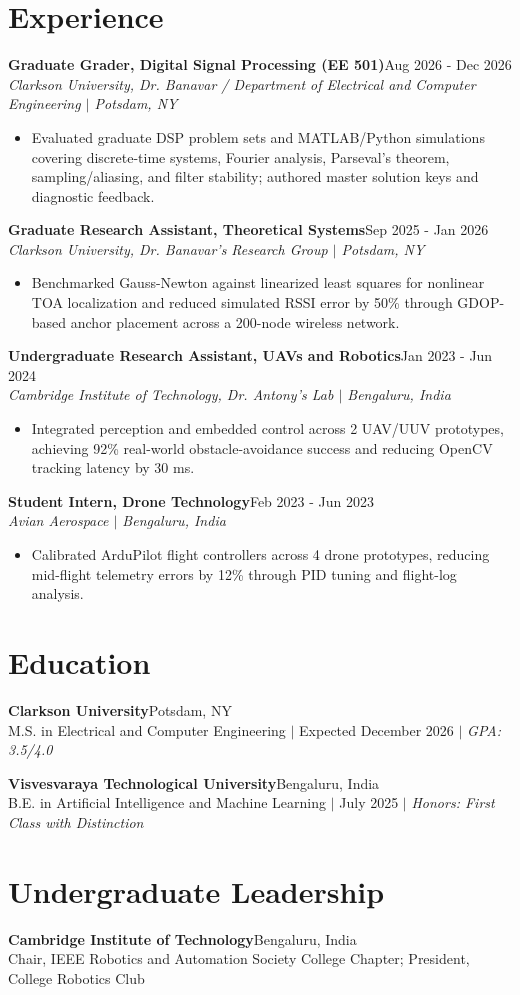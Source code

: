 \documentclass[10pt,letterpaper]{article}
\newcommand{\entry}[2]{\textbf{#1}\hfill #2\\[-1pt]}
\begin{document}
\section{Experience}
\entry{Graduate Grader, Digital Signal Processing (EE 501)}{Aug 2026 - Dec 2026}
{\small\textit{Clarkson University, Dr. Banavar / Department of Electrical and Computer Engineering $\mid$ Potsdam, NY}}
\begin{itemize}
  \item {\small Evaluated graduate DSP problem sets and MATLAB/Python simulations covering discrete-time systems, Fourier analysis, Parseval's theorem, sampling/aliasing, and filter stability; authored master solution keys and diagnostic feedback.}
\end{itemize}
\entry{Graduate Research Assistant, Theoretical Systems}{Sep 2025 - Jan 2026}
{\small\textit{Clarkson University, Dr. Banavar's Research Group $\mid$ Potsdam, NY}}
\begin{itemize}
  \item {\small Benchmarked Gauss-Newton against linearized least squares for nonlinear TOA localization and reduced simulated RSSI error by 50\% through GDOP-based anchor placement across a 200-node wireless network.}
\end{itemize}
\entry{Undergraduate Research Assistant, UAVs and Robotics}{Jan 2023 - Jun 2024}
{\small\textit{Cambridge Institute of Technology, Dr. Antony's Lab $\mid$ Bengaluru, India}}
\begin{itemize}
  \item {\small Integrated perception and embedded control across 2 UAV/UUV prototypes, achieving 92\% real-world obstacle-avoidance success and reducing OpenCV tracking latency by 30 ms.}
\end{itemize}
\entry{Student Intern, Drone Technology}{Feb 2023 - Jun 2023}
{\small\textit{Avian Aerospace $\mid$ Bengaluru, India}}
\begin{itemize}
  \item {\small Calibrated ArduPilot flight controllers across 4 drone prototypes, reducing mid-flight telemetry errors by 12\% through PID tuning and flight-log analysis.}
\end{itemize}

\section{Education}
\entry{Clarkson University}{Potsdam, NY}
{\small M.S. in Electrical and Computer Engineering $\mid$ Expected December 2026 $\mid$ \textit{GPA: 3.5/4.0}}\par
\vspace{1pt}
\entry{Visvesvaraya Technological University}{Bengaluru, India}
{\small B.E. in Artificial Intelligence and Machine Learning $\mid$ July 2025 $\mid$ \textit{Honors: First Class with Distinction}}\par

\section{Undergraduate Leadership}
\entry{Cambridge Institute of Technology}{Bengaluru, India}
{\small Chair, IEEE Robotics and Automation Society College Chapter; President, College Robotics Club}\par
\end{document}
